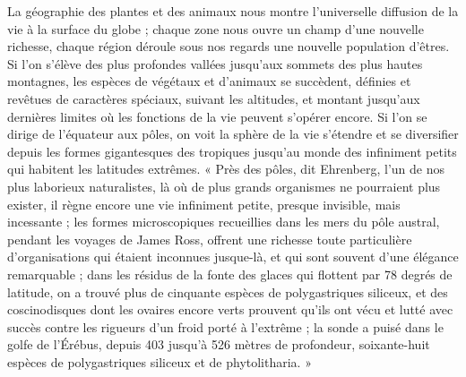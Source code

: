\documentclass[a4paper, 11pt, oneside, landscape]{article}
\begin{document}
La géographie des plantes et des animaux nous montre l'universelle diffusion de la vie à la surface du globe ; chaque zone nous ouvre un champ d'une nouvelle richesse, chaque région déroule sous nos regards une nouvelle population d'êtres. Si l'on s'élève des plus profondes vallées jusqu'aux sommets des plus hautes montagnes, les espèces de végétaux et d'animaux se succèdent, définies et revêtues de caractères spéciaux, suivant les altitudes, et montant jusqu'aux dernières limites où les fonctions de la vie peuvent s'opérer encore. Si l'on se dirige de l'équateur aux pôles, on voit la sphère de la vie s'étendre et se diversifier depuis les formes gigantesques des tropiques jusqu'au monde des infiniment petits qui habitent les latitudes extrêmes. « Près des pôles, dit Ehrenberg, l'un de nos plus laborieux naturalistes, là où de plus grands organismes ne pourraient plus exister, il règne encore une vie infiniment petite, presque invisible, mais incessante ; les formes microscopiques recueillies dans les mers du pôle austral, pendant les voyages de James Ross, offrent une richesse toute particulière d'organisations qui étaient inconnues jusque-là, et qui sont souvent d'une élégance remarquable ; dans les résidus de la fonte des glaces qui flottent par 78 degrés de latitude, on a trouvé plus de cinquante espèces de polygastriques siliceux, et des coscinodisques dont les ovaires encore verts prouvent qu'ils ont vécu et lutté avec succès contre les rigueurs d'un froid porté à l'extrême ; la sonde a puisé dans le golfe de l'Érébus, depuis 403 jusqu'à 526 mètres de profondeur, soixante-huit espèces de polygastriques siliceux et de phytolitharia. »
\end{document}
